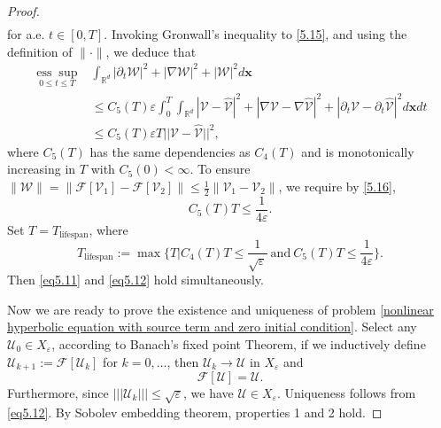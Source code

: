\documentclass[11pt,reqno,oneside]{amsart}
\numberwithin{equation}{section}
\theoremstyle{definition}
\theoremstyle{remark}
\numberwithin{equation}{section}
\begin{document}
\begin{proof}
\begin{equation*}
\begin{aligned}
			\end{aligned}
		\end{equation*}
		for a.e. $t \in [0,T]$. Invoking Gronwall's inequality to \eqref{5.15}, and using the definition of \(\|\cdot\|\),  we deduce that 
		\begin{equation}\label{5.16}
			\begin{aligned}
				\underset{0 \leq t \leq T}{\operatorname{ess} \sup }&\int_{\mathbb{R}^d} \left| \partial _t \mathscr{W} \right|^2+|\nabla \mathscr{W}|^2+|\mathscr{W}|^2 d\mathbf{x}\\
				&\leqslant C_5(T){\varepsilon}\int_{0}^{T}\int_{\mathbb{R}^d} \left|\mathscr{V}-\hat{\mathscr{V}} \right|^2+\left|\nabla\mathscr{V}-\nabla\hat{\mathscr{V}} \right|^2+\left|\partial_t\mathscr{V}-\partial_t\hat{\mathscr{V}} \right|^2d\mathbf{x} dt\\
				&\leqslant C_5(T){\varepsilon}T||\mathscr{V}-\hat{\mathscr{V}}||^2,
			\end{aligned}
		\end{equation}
		where \(C_5(T)\) has the same dependencies as \(C_4(T)\) and is monotonically increasing in \(T\) with \(C_5(0) < \infty\). 	To ensure \(\|\mathscr{W}\|=\| \mathscr{F}[\mathscr{V}_1]-\mathscr{F}[\mathscr{V}_2]\| \leqslant \frac{1}{2} \|\mathscr{V}_1 - \mathscr{V}_2\|\), we require by \eqref{5.16}, 
		\begin{equation}\label{eq C_T(5)}
			C_5(T) T \leqslant \frac{1}{4{\varepsilon}}.
		\end{equation}
		Set $T=T_{\text{lifespan}}$, where
		\begin{equation}\label{eq5.17}
			T_{\mathrm{lifespan}}:=\max\{T|	C_4(T) T \leqslant \frac{1}{\sqrt{\varepsilon}}\ \text{and}\ C_5(T) T \leqslant \frac{1}{4{\varepsilon}}\}.
		\end{equation}
		Then \eqref{eq5.11} and \eqref{eq5.12} hold simultaneously.
		
		Now we are ready to prove the existence and uniqueness of problem \eqref{nonlinear hyperbolic equation with source term and zero initial condition}. Select any $\mathscr{U}_0 \in X_\varepsilon$, according to  Banach's fixed point  Theorem, if we inductively define $\mathscr{U}_{k+1}:=\mathscr{F}\left[\mathscr{U}_k\right]$ for $k=0, \ldots$, then ${\mathscr{U}}_k \rightarrow {\mathscr{U}}$ in $X_\varepsilon$ and
		$$
		\mathscr{F}[\mathscr{U}]=\mathscr{U}.
		$$
		Furthermore, since $|||\mathscr{U}_k|||\leq \sqrt{\varepsilon}$, we have $\mathscr{U} \in X_\varepsilon$. Uniqueness follows from \eqref{eq5.12}. By Sobolev embedding theorem, properties 1 and 2 hold. 
		

\end{proof}
\end{document}
